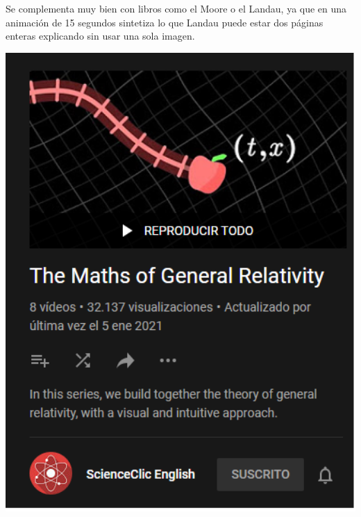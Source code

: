 Se complementa muy bien con libros como el Moore o el Landau, ya que en una animación de 15 segundos sintetiza lo que Landau puede estar dos páginas enteras explicando sin usar una sola imagen.
\begin{marginfigure}
\includegraphics[width=1.3\textwidth]{Im/scienceclic.png}
\end{marginfigure}

